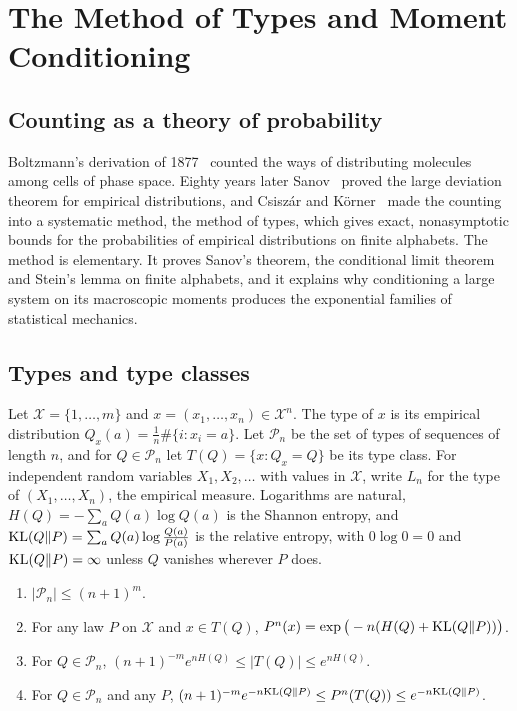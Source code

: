\chapter{The Method of Types and Moment Conditioning}
\label{ch:types}

\section{Counting as a theory of probability}

Boltzmann's derivation of 1877~\cite{boltzmann1877} counted the ways of distributing molecules among cells of phase space. Eighty years later Sanov~\cite{sanov1957} proved the large deviation theorem for empirical distributions, and Csisz\'ar and K\"orner~\cite{csiszarkorner2011} made the counting into a systematic method, the method of types, which gives exact, nonasymptotic bounds for the probabilities of empirical distributions on finite alphabets. The method is elementary. It proves Sanov's theorem, the conditional limit theorem and Stein's lemma on finite alphabets, and it explains why conditioning a large system on its macroscopic moments produces the exponential families of statistical mechanics.

\section{Types and type classes}

Let $\mathcal{X} = \{1,\dots,m\}$ and $x = (x_1,\dots,x_n)\in\mathcal{X}^n$. The type of $x$ is its empirical distribution $Q_x(a) = \frac1n\#\{i:x_i = a\}$. Let $\mathcal{P}_n$ be the set of types of sequences of length $n$, and for $Q\in\mathcal{P}_n$ let $T(Q) = \{x:Q_x = Q\}$ be its type class. For independent random variables $X_1,X_2,\dots$ with values in $\mathcal{X}$, write $L_n$ for the type of $(X_1,\dots,X_n)$, the empirical measure. Logarithms are natural, $H(Q) = -\sum_aQ(a)\log Q(a)$ is the Shannon entropy, and $\mathrm{KL}(Q\|P) = \sum_aQ(a)\log\frac{Q(a)}{P(a)}$ is the relative entropy, with $0\log0 = 0$ and $\mathrm{KL}(Q\|P) = \infty$ unless $Q$ vanishes wherever $P$ does.

\begin{theorem}
\label{thm:typecount}
\begin{enumerate}
\item $|\mathcal{P}_n|\leq(n+1)^m$.
\item For any law $P$ on $\mathcal{X}$ and $x\in T(Q)$, $P^n(x) = \exp\big(-n(H(Q)+\mathrm{KL}(Q\|P))\big)$.
\item For $Q\in\mathcal{P}_n$, $(n+1)^{-m}e^{nH(Q)}\leq|T(Q)|\leq e^{nH(Q)}$.
\item For $Q\in\mathcal{P}_n$ and any $P$, $(n+1)^{-m}e^{-n\mathrm{KL}(Q\|P)}\leq P^n(T(Q))\leq e^{-n\mathrm{KL}(Q\|P)}$.
\end{enumerate}
\end{theorem}

